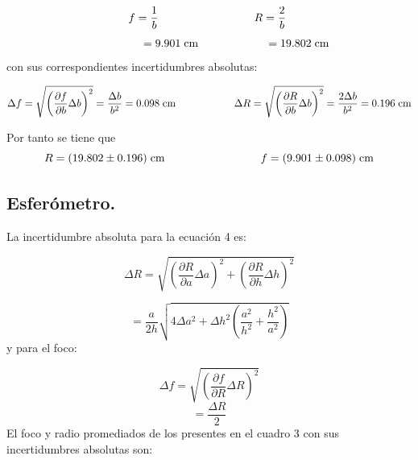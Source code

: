 \documentclass[DIV=calc, paper=a4, fontsize=11pt]{scrartcl}
\begin{document}
\begin{equation*}
    f=\frac{1}{b}   \hspace{3cm} R = \frac{2}{b} \hspace{0.1cm}
\end{equation*}
\begin{equation*}
    \hspace{1.7cm}= 9.901 \hspace{0.1cm} \text{cm}  \hspace{2.1cm} =19.802 \hspace{0.1cm} \text{cm} 
\end{equation*}
con sus correspondientes incertidumbres absolutas:

\begin{equation*}
    \Delta f =\sqrt{\left(\frac{\partial f}{\partial b} \Delta b\right)^{2}} = \frac{\Delta b}{b^{2}} = 0.098\hspace{0.1cm} \text{cm} \hspace{2cm} \Delta R = \sqrt{\left(\frac{\partial R}{\partial b} \Delta b\right)^{2}}= \frac{2\Delta b}{b^2} =0.196\hspace{0.1cm} \text{cm}
\end{equation*}

Por tanto se tiene que 
\begin{equation*}
   R={(19.802 \pm 0.196)\hspace{0.1cm} \text{cm}} \hspace{3cm}  f={(9.901 \pm 0.098)\hspace{0.1cm} \text{cm}}
\end{equation*}

\subsection*{\textcolor{carmine}{Esferómetro.}}

La incertidumbre absoluta para la ecuación 4 es:

\begin{equation*}
    \Delta R =\sqrt{\left(\frac{\partial R}{\partial a} \Delta a\right)^2+\left(\frac{\partial R}{\partial h} \Delta h\right)^{2}}
\end{equation*}

\begin{equation*}
    = \frac{a}{2h}\sqrt{4\Delta a^2 + \Delta h^{2}\left(\frac{a^2}{h^2}+\frac{h^2}{a^2}\right)}
\end{equation*}
y para el foco:

\begin{equation*}
    \Delta f = \sqrt{\left(\frac{\partial f}{\partial R}\Delta R\right)^{2}}
\end{equation*}
\begin{equation*}
    = \frac{\Delta R}{2}
\end{equation*}
El foco y radio promediados de los presentes en el cuadro 3 con sus incertidumbres absolutas son:
\end{document}
